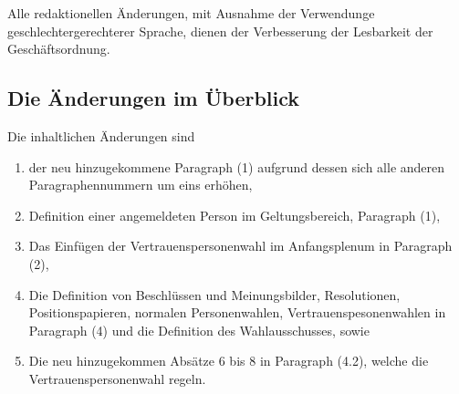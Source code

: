\documentclass[draft,12pt,oneside]{scrartcl}
\begin{document}
Alle redaktionellen Änderungen, mit Ausnahme der Verwendunge geschlechtergerechterer Sprache,
dienen der Verbesserung der Lesbarkeit der Geschäftsordnung.

\subsection*{Die Änderungen im Überblick}

Die inhaltlichen Änderungen sind
\begin{enumerate}
\item der neu hinzugekommene Paragraph (1) aufgrund dessen sich alle anderen Paragraphennummern
      um eins erhöhen,
\item Definition einer angemeldeten Person im Geltungsbereich, Paragraph (1),
\item Das Einfügen der Vertrauenspersonenwahl im Anfangsplenum in Paragraph (2),
\item Die Definition von Beschlüssen und Meinungsbilder, Resolutionen, Positionspapieren,
      normalen Personenwahlen, Vertrauenspesonenwahlen in Paragraph (4) und die Definition des Wahlausschusses, sowie
\item Die neu hinzugekommen Absätze 6 bis 8 in Paragraph (4.2), welche die Vertrauenspersonenwahl
      regeln.
\end{enumerate}
\end{document}
